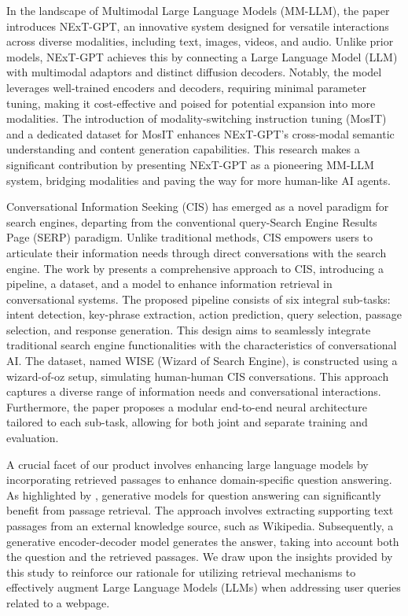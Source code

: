 \documentclass[sigconf,natbib=true,anonymous=false]{acmart}
\begin{document}
In the landscape of Multimodal Large Language Models (MM-LLM), the paper \textbf{\cite{wu2023nextgpt} }introduces NExT-GPT, an innovative system designed for versatile interactions across diverse modalities, including text, images, videos, and audio. Unlike prior models, NExT-GPT achieves this by connecting a Large Language Model (LLM) with multimodal adaptors and distinct diffusion decoders. Notably, the model leverages well-trained encoders and decoders, requiring minimal parameter tuning, making it cost-effective and poised for potential expansion into more modalities. The introduction of modality-switching instruction tuning (MosIT) and a dedicated dataset for MosIT enhances NExT-GPT's cross-modal semantic understanding and content generation capabilities. This research makes a significant contribution by presenting NExT-GPT as a pioneering MM-LLM system, bridging modalities and paving the way for more human-like AI agents.

Conversational Information Seeking (CIS) has emerged as a novel paradigm for search engines, departing from the conventional query-Search Engine Results Page (SERP) paradigm. Unlike traditional methods, CIS empowers users to articulate their information needs through direct conversations with the search engine. The work by \cite{wizard-of-search-engine} presents a comprehensive approach to CIS, introducing a pipeline, a dataset, and a model to enhance information retrieval in conversational systems. The proposed pipeline consists of six integral sub-tasks: intent detection, key-phrase extraction, action prediction, query selection, passage selection, and response generation. This design aims to seamlessly integrate traditional search engine functionalities with the characteristics of conversational AI. The dataset, named WISE (Wizard of Search Engine), is constructed using a wizard-of-oz setup, simulating human-human CIS conversations. This approach captures a diverse range of information needs and conversational interactions. Furthermore, the paper proposes a modular end-to-end neural architecture tailored to each sub-task, allowing for both joint and separate training and evaluation.

A crucial facet of our product involves enhancing large language models by incorporating retrieved passages to enhance domain-specific question answering. As highlighted by \cite{izacard-grave-2021-leveraging}, generative models for question answering can significantly benefit from passage retrieval. The approach involves extracting supporting text passages from an external knowledge source, such as Wikipedia. Subsequently, a generative encoder-decoder model generates the answer, taking into account both the question and the retrieved passages. We draw upon the insights provided by this study to reinforce our rationale for utilizing retrieval mechanisms to effectively augment Large Language Models (LLMs) when addressing user queries related to a webpage.
\end{document}
